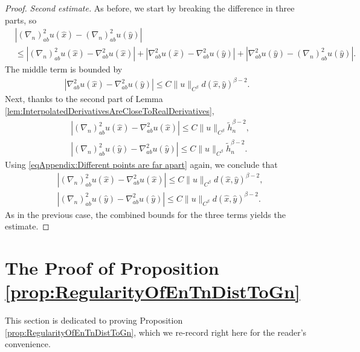 \documentclass[11pt,reqno]{amsart}
\numberwithin{equation}{section}
\theoremstyle{plain}
\begin{document}
\begin{proof}
  \noindent \emph{Second estimate.} As before, we start by breaking the difference in three parts, so
  \begin{align*}
    & |(\nabla_n)_{ab}^2 u(\hat x)-(\nabla_n)_{ab}^2 u(\hat y)|\\
    & \leq |(\nabla_n)_{ab}^2 u(\hat x)-\nabla_{ab}^2 u(\hat x)|+|\nabla_{ab}^2 u(\hat x)-\nabla_{ab}^2 u(\hat y)|+|\nabla_{ab}^2 u(\hat y)-(\nabla_n)_{ab}^2 u(\hat y)|.
  \end{align*}
  The middle term is bounded by
  \begin{align*}
    |\nabla_{ab}^2 u(\hat x)-\nabla_{ab}^2 u(\hat y)| \leq C\|u\|_{C^\beta}d(\hat x,\hat y)^{\beta-2}.  	  
  \end{align*}	  
  Next, thanks to the second part of Lemma \ref{lem:InterpolatedDerivativesAreCloseToRealDerivatives},
  \begin{align*}	
    & |(\nabla_n)_{ab}^2 u(\hat x)-\nabla_{ab}^2 u(\hat x)| \leq C\|u\|_{C^\beta}\tilde h_n^{\beta-2},\\
    & |(\nabla_n)_{ab}^2 u(\hat y)-\nabla_{ab}^2 u(\hat y)| \leq C\|u\|_{C^\beta}\tilde h_n^{\beta-2}.
  \end{align*}	  
  Using \eqref{eqAppendix:Different points are far apart} again, we conclude that
  \begin{align*}	
    & |(\nabla_n)_{ab}^2 u(\hat x)-\nabla_{ab}^2 u(\hat x)| \leq C\|u\|_{C^\beta}d(\hat x,\hat y)^{\beta-2},\\
    & |(\nabla_n)_{ab}^2 u(\hat y)-\nabla_{ab}^2 u(\hat y)| \leq C\|u\|_{C^\beta}d(\hat x,\hat y)^{\beta-2}.
  \end{align*}	  
  As in the previous case, the combined bounds for the three terms yields the estimate.
\end{proof}









\section{The Proof of Proposition \ref{prop:RegularityOfEnTnDistToGn}}\label{sec:ProofOfRegAtDistToBoundary}

This section is dedicated to proving Proposition \ref{prop:RegularityOfEnTnDistToGn}, which we re-record right here for the reader's convenience. 
\end{document}
